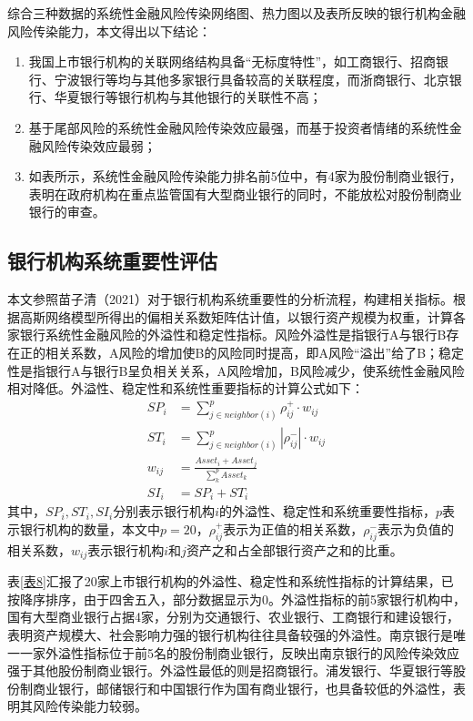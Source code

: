 \documentclass[lang=cn]{elegantpaper}
\begin{document}
综合三种数据的系统性金融风险传染网络图、热力图以及表所反映的银行机构金融风险传染能力，本文得出以下结论：
\begin{enumerate}
    \item 我国上市银行机构的关联网络结构具备“无标度特性”，如工商银行、招商银行、宁波银行等均与其他多家银行具备较高的关联程度，而浙商银行、北京银行、华夏银行等银行机构与其他银行的关联性不高；
    \item 基于尾部风险的系统性金融风险传染效应最强，而基于投资者情绪的系统性金融风险传染效应最弱；
    \item 如表所示，系统性金融风险传染能力排名前5位中，有4家为股份制商业银行，表明在政府机构在重点监管国有大型商业银行的同时，不能放松对股份制商业银行的审查。
\end{enumerate}

\subsection{银行机构系统重要性评估}
本文参照苗子清（2021）对于银行机构系统重要性的分析流程，构建相关指标。根据高斯网络模型所得出的偏相关系数矩阵估计值，以银行资产规模为权重，计算各家银行系统性金融风险的外溢性和稳定性指标。风险外溢性是指银行A与银行B存在正的相关系数，A风险的增加使B的风险同时提高，即A风险“溢出”给了B；稳定性是指银行A与银行B呈负相关关系，A风险增加，B风险减少，使系统性金融风险相对降低。外溢性、稳定性和系统性重要指标的计算公式如下：
\begin{align}
    SP_i&=\sum_{j\in neighbor(i)}^p \rho_{ij}^{+}\cdot w_{ij}\\
    ST_i&=\sum_{j\in neighbor(i)}^p |\rho_{ij}^{-}|\cdot w_{ij}\\
    w_{ij}&=\frac{Asset_i+Asset_j}{\sum_k^p Asset_k}\\
    SI_i&=SP_i+ST_i
\end{align}
其中，$SP_i,ST_i,SI_i$分别表示银行机构$i$的外溢性、稳定性和系统重要性指标，$p$表示银行机构的数量，本文中$p=20$，$\rho_{ij}^{+}$表示为正值的相关系数，$\rho_{ij}^{-}$表示为负值的相关系数，$w_{ij}$表示银行机构$i$和$j$资产之和占全部银行资产之和的比重。

表\ref{表8}汇报了20家上市银行机构的外溢性、稳定性和系统性指标的计算结果，已按降序排序，由于四舍五入，部分数据显示为0。外溢性指标的前5家银行机构中，国有大型商业银行占据4家，分别为交通银行、农业银行、工商银行和建设银行，表明资产规模大、社会影响力强的银行机构往往具备较强的外溢性。南京银行是唯一一家外溢性指标位于前5名的股份制商业银行，反映出南京银行的风险传染效应强于其他股份制商业银行。外溢性最低的则是招商银行。浦发银行、华夏银行等股份制商业银行，邮储银行和中国银行作为国有商业银行，也具备较低的外溢性，表明其风险传染能力较弱。
\end{document}
